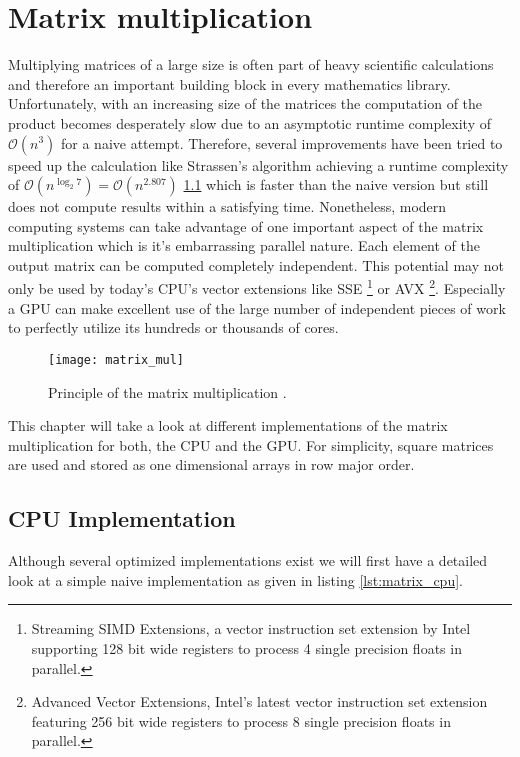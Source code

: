 \section{Matrix multiplication}

Multiplying matrices of a large size is often part of heavy scientific calculations and therefore an important building block in every mathematics library. Unfortunately, with an increasing size of the matrices the computation of the product becomes desperately slow due to an asymptotic runtime complexity of $\mathcal{O}(n^3)$ for a naive attempt. Therefore, several improvements have been tried to speed up the calculation like Strassen's algorithm achieving a runtime complexity of $\mathcal{O}(n^{\log_2 7}) = \mathcal{O}(n^{2.807})$ \ref{} which is faster than the naive version but still does not compute results within a satisfying time.
Nonetheless, modern computing systems can take advantage of one important aspect of the matrix multiplication which is it's embarrassing parallel nature. Each element of the output matrix can be computed completely independent. This potential may not only be used by today's CPU's vector extensions like SSE \footnote{Streaming SIMD Extensions, a vector instruction set extension by Intel supporting 128 bit wide registers to process 4 single precision floats in parallel.} or AVX \footnote{Advanced Vector Extensions, Intel's latest vector instruction set extension featuring 256 bit wide registers to process 8 single precision floats in parallel.}. Especially a GPU can make excellent use of the large number of independent pieces of work to perfectly utilize its hundreds or thousands of cores.

\begin{figure}
\centering
\texttt{[image: matrix\_mul]}
\caption{Principle of the matrix multiplication \cite{wiki_matrix_mul}.}
\label{fig:matrix_mul}
\end{figure}

This chapter will take a look at different implementations of the matrix multiplication for both, the CPU and the GPU. For simplicity, square matrices are used and stored as one dimensional arrays in row major order.

\subsection{CPU Implementation}

Although several optimized implementations exist we will first have a detailed look at a simple naive implementation as given in listing \ref{lst:matrix_cpu}.

